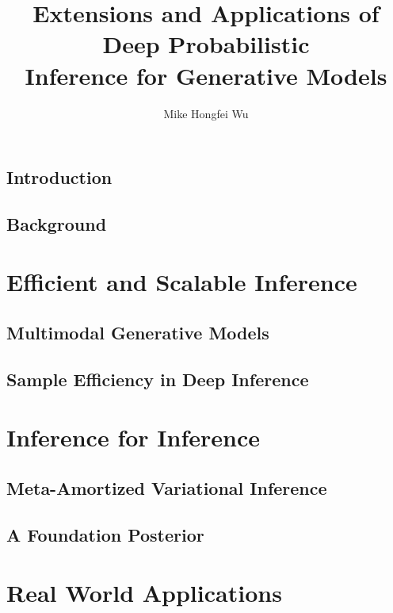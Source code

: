 \documentclass[12pt,letterpaper]{report}
\title{Extensions and Applications of Deep Probabilistic \\ Inference for Generative Models}
\author{Mike Hongfei Wu}
\begin{document}
\beforepreface




\afterpreface

\chapter{Introduction}


\chapter{Background}
\label{chapter:background}


\part{Efficient and Scalable Inference}

\chapter{Multimodal Generative Models}
\label{chapter:mvae}


\chapter{Sample Efficiency in Deep Inference}
\label{chapter:antivae}


\part{Inference for Inference}

\chapter{Meta-Amortized Variational Inference}
\label{chapter:metavae}


\chapter{A Foundation Posterior}
\label{chapter:foundation}


\part{Real World Applications}
\end{document}
